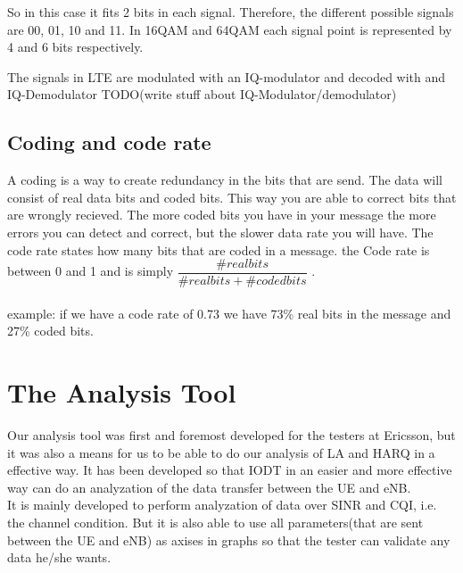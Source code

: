 \documentclass[cropmarks, frame, english]{idamasterthesis}
\begin{document}
 So in this case it fits 2 bits in each signal. Therefore, the different possible signals are 00, 01, 10 and 11. In 16QAM and 64QAM each signal point is represented by 4 and 6 bits respectively.

The signals in LTE are modulated with an IQ-modulator and decoded with and IQ-Demodulator 
TODO(write stuff about IQ-Modulator/demodulator)

\section{Coding and code rate}
A coding is a way to create redundancy in the bits that are send. The data will consist of real data bits and coded bits. This way you are able to correct bits that are wrongly recieved. The more coded bits you have in your message the more errors you can detect and correct, but the slower data rate you will have. The code rate states how many bits that are coded in a message. the Code rate is between 0 and 1 and is simply $\dfrac{\# real bits}{ \# real bits + \# coded bits}$ . 
\\ \\
example: if we have a code rate of 0.73 we have 73\% real bits in the message and 27\% coded bits. 


\chapter{The Analysis Tool}
Our analysis tool was first and foremost developed for the testers at Ericsson, but it was also a means for us to be able to do our analysis of LA and HARQ in a effective way. It has been developed so that IODT in an easier and more effective way can do an analyzation of the data transfer between the UE and eNB. \\
It is mainly developed to perform analyzation of data over SINR and CQI, i.e. the channel condition. But it is also able to use all parameters(that are sent between the UE and eNB) as axises in graphs so that the tester can validate any data he/she wants.
\end{document}
